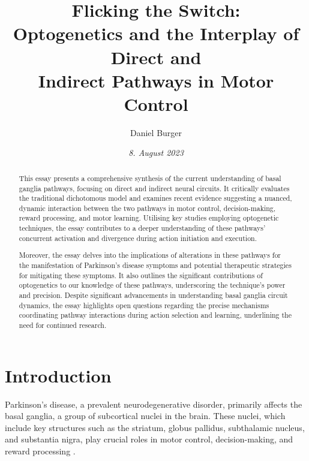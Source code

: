 \documentclass[10pt]{article}
\title{\textbf{Flicking the Switch: } \\ Optogenetics and the Interplay of Direct and \\ Indirect Pathways in Motor Control}
\author[ ]{Daniel Burger}
\affil[ ]{\textbf{King’s College London}}
\affil[ ]{\href{mailto:public@danielburger.online}{public@danielburger.online}}
\date{\textit{8. August 2023}}
\begin{document}

\maketitle
\thispagestyle{empty}


\begin{sloppypar} %
  \begin{abstract}
    This essay presents a comprehensive synthesis of the current understanding of basal ganglia pathways, focusing on direct and indirect neural circuits. It critically evaluates the traditional dichotomous model and examines recent evidence suggesting a nuanced, dynamic interaction between the two pathways in motor control, decision-making, reward processing, and motor learning. Utilising key studies employing optogenetic techniques, the essay contributes to a deeper understanding of these pathways’ concurrent activation and divergence during action initiation and execution.

    Moreover, the essay delves into the implications of alterations in these pathways for the manifestation of Parkinson’s disease symptoms and potential therapeutic strategies for mitigating these symptoms. It also outlines the significant contributions of optogenetics to our knowledge of these pathways, underscoring the technique’s power and precision. Despite significant advancements in understanding basal ganglia circuit dynamics, the essay highlights open questions regarding the precise mechanisms coordinating pathway interactions during action selection and learning, underlining the need for continued research.
  \end{abstract}
  \pagebreak

  \tableofcontents
  \pagebreak

  \listoffigures
  \pagebreak



  \section{Introduction}
  \label{sec:introduction}

  Parkinson’s disease, a prevalent neurodegenerative disorder, primarily affects the basal ganglia, a group of subcortical nuclei in the brain. These nuclei, which include key structures such as the striatum, globus pallidus, subthalamic nucleus, and substantia nigra, play crucial roles in motor control, decision-making, and reward processing \citep{zhang_oculomotor_2018,ojagbemi_neuropsychiatric_2013}.


\end{sloppypar}
\end{document}
